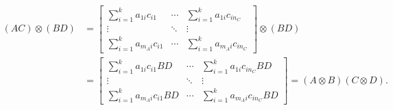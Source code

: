 \begin{align*}
  (AC)\otimes (BD) &= \begin{bmatrix}
 \sum\limits^{k}_{i = 1}a_{1i}c_{i1} & \cdots & \sum\limits^{k}_{i = 1}a_{1i}c_{in_{C}}\\
 \vdots & \ddots & \vdots\\
 \sum\limits^{k}_{i = 1}a_{m_{A}i}c_{i1} & \cdots & \sum\limits^{k}_{i = 1}a_{m_{A}i}c_{in_{C}}
 \end{bmatrix} \otimes (BD)\\
 &=  \begin{bmatrix}
\sum\limits^{k}_{i = 1}a_{1i}c_{i1}BD & \cdots & \sum\limits^{k}_{i = 1}a_{1i}c_{in_{C}}BD\\
\vdots & \ddots & \vdots\\
\sum\limits^{k}_{i = 1}a_{m_{A}i}c_{i1}BD & \cdots & \sum\limits^{k}_{i = 1}a_{m_{A}i}c_{in_{C}}BD
\end{bmatrix} = (A\otimes B)(C\otimes D) .
\end{align*}
